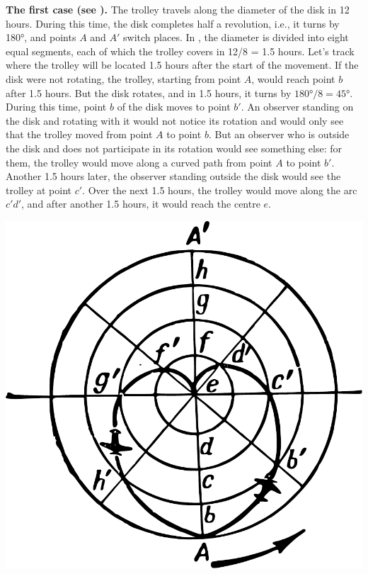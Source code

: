 \textbf{The first case (see ).} The trolley travels along the diameter of the disk in 12 hours. During this time, the disk completes half a revolution, i.e., it turns by \ang{180}, and points $A$ and $A'$ switch places. In , the diameter is divided into eight equal segments, each of which the trolley covers in 12/8 = 1.5 hours. Let's track where the trolley will be located 1.5 hours after the start of the movement. If the disk were not rotating, the trolley, starting from point $A$, would reach point $b$ after 1.5 hours. But the disk rotates, and in 1.5 hours, it turns by $\ang{180}/8 = \ang{45}$. During this time, point $b$ of the disk moves to point $b'$. An observer standing on the disk and rotating with it would not notice its rotation and would only see that the trolley moved from point $A$ to point $b$. But an observer who is outside the disk and does not participate in its rotation would see something else: for them, the trolley would move along a curved path from point $A$ to point $b'$. Another 1.5 hours later, the observer standing outside the disk would see the trolley at point $c'$. Over the next 1.5 hours, the trolley would move along the arc $c'd'$, and after another 1.5 hours, it would reach the centre $e$.

\begin{marginfigure}[-2cm]%
\centering
\includegraphics[width=\textwidth]{figures/ch-09/fig-135.pdf}
\end{marginfigure}


